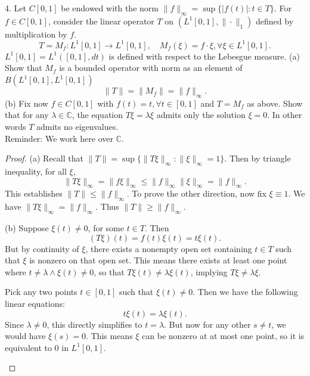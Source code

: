 \begin{problem}
	4. Let $C[0,1]$ be endowed with the norm $\|f\|_{\infty}=\sup \{|f(t)|: t \in T\}$. For $f \in C[0,1]$, consider the linear operator $T$ on $\left(L^1[0,1],\|\cdot\|_1\right)$ defined by multiplication by $f$.
\[
T=M_f: L^1[0,1] \rightarrow L^1[0,1], \quad M_f(\xi)=f \cdot \xi, \forall \xi \in L^1[0,1] .
\]
$L^1[0,1]=L^1([0,1], d t)$ is defined with respect to the Lebesgue measure.
(a) Show that $M_f$ is a bounded operator with norm as an element of $B\left(L^1[0,1], L^1[0,1]\right)$
\[
\|T\|=\left\|M_f\right\|=\|f\|_{\infty} .
\]
(b) Fix now $f \in C[0,1]$ with $f(t)=t, \forall t \in[0,1]$ and $T=M_f$ as above. Show that for any $\lambda \in \mathbb{C}$, the equation $T \xi=\lambda \xi$ admits only the solution $\xi=0$. In other words $T$ admits no eigenvalues.\\
Reminder: We work here over $\mathbb{C}$.
\end{problem}
\begin{proof}
		(a) Recall that $\|T\| = \sup \{\|T \xi\|_{\infty }: \|\xi\|_\infty = 1\} $.
		Then by triangle inequality, for all $\xi$,
		\[
			\|T \xi\|_\infty = \|f \xi\|_\infty \le \|f\|_\infty  \|\xi\|_\infty  = \|f\|_\infty 
		.\] 
		This establishes $\|T\|\le \|f\|_\infty $.
		To prove the other direction, now fix $\xi \equiv 1$. We have $\|T \xi\|_\infty  = \|f\|_\infty $. Thus $\|T\| \ge \|f\|_\infty	$.

		(b) Suppose $\xi(t) \neq 0$, for some $t \in T$. Then
		\[
			(T \xi)(t) = f(t) \xi(t) = t \xi(t) 
		.\] 
		But by continuity of $\xi$, there exists a nonempty open set containing $t \in T$ such that $\xi$ is nonzero on that open set. This means there exists at least one point where $t \neq \lambda \wedge \xi(t) \neq 0$, so that $T \xi(t) \neq  \lambda \xi(t)$, implying $T \xi \neq \lambda \xi$.

		\begin{correction}
			Pick any two points $t \in [0,1]$ such that $\xi(t) \neq 0$. Then we have the following linear equations:
			\[
				t \xi(t) = \lambda \xi(t)
			.\] 
			Since $\lambda \neq 0$, this directly simplifies to $t = \lambda$. But now for any other $s \neq t$, we would have $\xi(s) = 0$. This means $\xi$ can be nonzero at at most one point, so it is equivalent to $0$ in $L^1[0,1]$.
		\end{correction}
\end{proof}

